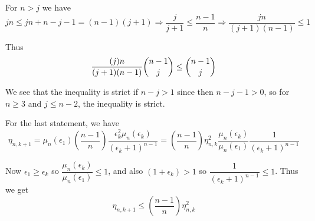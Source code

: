 \documentclass{article}
\begin{document}
For $n> j$ we have 
\[jn \le jn + n - j - 1 = (n-1)(j+1) \Longrightarrow \dfrac{j}{j+1} \le \dfrac{n-1}{n} \Longrightarrow \dfrac{jn}{(j+1)(n-1)} \le 1\]

Thus
\[\dfrac{(j)n}{(j+1)(n-1)} \dbinom{n-1}{j} \le \dbinom{n-1}{j}\]

We see that the inequality is strict if $n-j>1$ since then $n-j-1>0$, so for $n\ge 3$ and $j\le n-2$, the inequality is strict. 

For the last statement, we have
\[\eta_{n,k+1} = \mu_n(\epsilon_1) \left(\dfrac{n-1}{n}\right) \dfrac{\epsilon_k^2 \mu_n (\epsilon_k)}{(\epsilon_k +1)^{n-1}} =  \left(\dfrac{n-1}{n}\right) \eta_{n,k}^2 \dfrac{\mu_n(\epsilon_k)}{\mu_n(\epsilon_1)} \dfrac{1}{(\epsilon_k+1)^{n-1}}\]

Now $\epsilon_1 \ge \epsilon_k$ so $\dfrac{\mu_n(\epsilon_k)}{\mu_n(\epsilon_1)} \le 1$, and also $(1+\epsilon_k)>1$ so $\dfrac{1}{(\epsilon_k+1)^{n-1}} \le 1$. Thus we get
\[\eta_{n,k+1} \le \left(\dfrac{n-1}{n}\right) \eta_{n,k}^2\]
\end{document}
